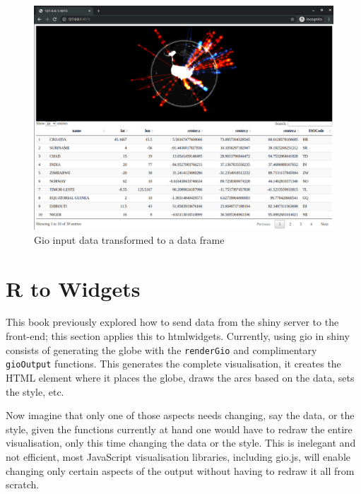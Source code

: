 \documentclass[
]{krantz}
\begin{document}
\begin{figure}[t]

{\centering \includegraphics[width=1\linewidth]{images/gio-input-handler} 

}

\caption{Gio input data transformed to a data frame}\label{fig:gio-input-handler}
\end{figure}

\hypertarget{shiny-widgets-r-to-widgets}{%
\section{R to Widgets}\label{shiny-widgets-r-to-widgets}}

This book previously explored how to send data from the shiny server to the front-end; this section applies this to htmlwidgets. Currently, using gio in shiny consists of generating the globe with the \texttt{renderGio} and complimentary \texttt{gioOutput} functions. This generates the complete visualisation, it creates the HTML element where it places the globe, draws the arcs based on the data, sets the style, etc.

Now imagine that only one of those aspects needs changing, say the data, or the style, given the functions currently at hand one would have to redraw the entire visualisation, only this time changing the data or the style. This is inelegant and not efficient, most JavaScript visualisation libraries, including gio.js, will enable changing only certain aspects of the output without having to redraw it all from scratch.
\end{document}
